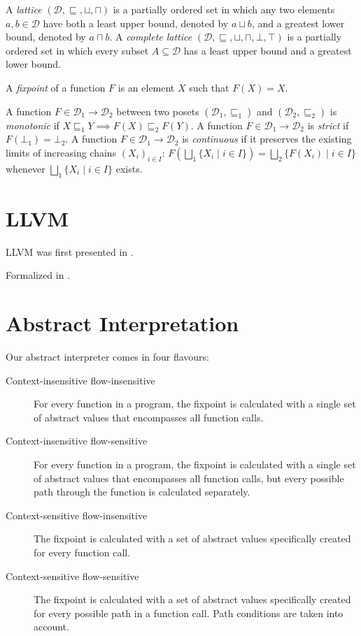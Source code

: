 \documentclass[a4paper]{book}
\begin{document}
A \emph{lattice} $(\mathcal{D}, \sqsubseteq, \sqcup, \sqcap)$ is a
partially ordered set in which any two elements $a, b \in \mathcal{D}$
have both a least upper bound, denoted by $a \sqcup b$, and a greatest
lower bound, denoted by $a \sqcap b$.  A \emph{complete lattice}
$(\mathcal{D}, \sqsubseteq, \sqcup, \sqcap, \bot, \top)$ is a
partially ordered set in which every subset $A \subseteq \mathcal{D}$
has a least upper bound and a greatest lower bound.

A \emph{fixpoint} of a function $F$ is an element $X$ such that $F(X)
= X$.

A function $F \in \mathcal{D}_1 \to \mathcal{D}_2$ between two posets
$(\mathcal{D}_1, \sqsubseteq_1)$ and $(\mathcal{D}_2, \sqsubseteq_2)$
is \emph{monotonic} if $X \sqsubseteq_1 Y \implies F(X) \sqsubseteq_2
F(Y)$.  A function $F \in \mathcal{D}_1 \to \mathcal{D}_2$ is
\emph{strict} if $F(\bot_1) = \bot_2$.  A function $F \in
\mathcal{D}_1 \to \mathcal{D}_2$ is \emph{continuous} if it preserves
the existing limits of increasing chains $(X_i)_{i \in I}$:
$F(\bigsqcup_1 \{ X_i \mid i \in I \}) = \bigsqcup_2 \{ F(X_i) \mid i
\in I \}$ whenever $\bigsqcup_1 \{ X_i \mid i \in I \}$ exists.


\chapter{LLVM}
LLVM was first presented in \cite{LA04}.

Formalized in \cite{ZNMZ12}.

\chapter{Abstract Interpretation}
Our abstract interpreter comes in four flavours:
\begin{description}
\item[Context-insensitive flow-insensitive] For every function in a
  program, the fixpoint is calculated with a single set of abstract
  values that encompasses all function calls.
\item[Context-insensitive flow-sensitive] For every function in a
  program, the fixpoint is calculated with a single set of abstract
  values that encompasses all function calls, but every possible path
  through the function is calculated separately.
\item[Context-sensitive flow-insensitive] The fixpoint is calculated
  with a set of abstract values specifically created for every
  function call.
\item[Context-sensitive flow-sensitive] The fixpoint is calculated
  with a set of abstract values specifically created for every
  possible path in a function call.  Path conditions are taken into
  account.
\end{description}
\end{document}
